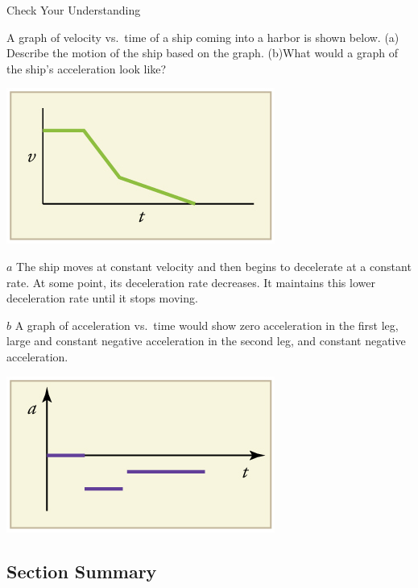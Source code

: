 \documentclass[
]{book}
\begin{document}
\hypertarget{fs-id1571006}{}
Check Your Understanding

\leavevmode{}%
A graph of velocity vs.~time of a ship coming into a harbor is shown
below. (a) Describe the motion of the ship based on the graph. (b)What
would a graph of the ship's acceleration look like?

\includegraphics{images/Figure_02_07_04a.jpg}

\leavevmode{}%
\(a\) The ship moves at constant velocity and then begins to decelerate
at a constant rate. At some point, its deceleration rate decreases. It
maintains this lower deceleration rate until it stops moving.

\(b\) A graph of acceleration vs.~time would show zero acceleration in
the first leg, large and constant negative acceleration in the second
leg, and constant negative acceleration.

\includegraphics{images/Figure_02_07_04b.jpg}

\hypertarget{fs-id1762928-summary}{}
\hypertarget{section-summary-7}{%
\subsection{Section Summary}\label{section-summary-7}}
\end{document}
